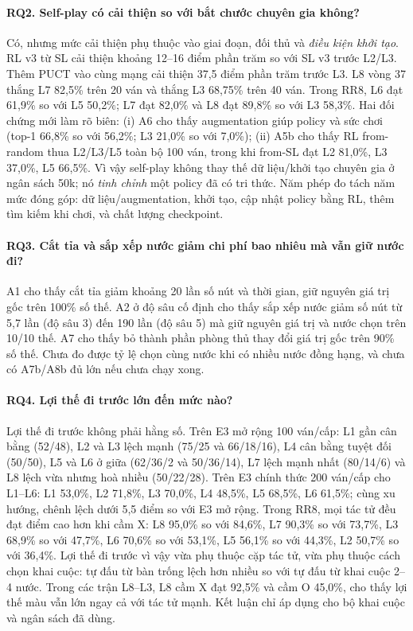 \paragraph{RQ2. Self-play có cải thiện so với bắt chước chuyên gia không?}
Có, nhưng mức cải thiện phụ thuộc vào giai đoạn, đối thủ và \emph{điều kiện khởi tạo}. RL v3
từ SL cải thiện khoảng 12--16 điểm phần trăm so với SL v3 trước L2/L3. Thêm PUCT vào cùng mạng
cải thiện 37,5 điểm phần trăm trước L3. L8 vòng 37 thắng L7 82,5\% trên 20 ván và thắng L3
68,75\% trên 40 ván. Trong RR8, L6 đạt 61,9\% so với L5 50,2\%; L7 đạt 82,0\% và L8 đạt 89,8\%
so với L3 58,3\%. Hai đối chứng mới làm rõ biên: (i) A6 cho thấy augmentation giúp policy và sức
chơi (top-1 66,8\% so với 56,2\%; L3 21,0\% so với 7,0\%); (ii) A5b cho thấy RL from-random
thua L2/L3/L5 toàn bộ 100 ván, trong khi from-SL đạt L2 81,0\%, L3 37,0\%, L5 66,5\%. Vì vậy
self-play không thay thế dữ liệu/khởi tạo chuyên gia ở ngân sách 50k; nó \emph{tinh chỉnh} một
policy đã có tri thức. Năm phép đo tách năm mức đóng góp: dữ liệu/augmentation, khởi tạo, cập
nhật policy bằng RL, thêm tìm kiếm khi chơi, và chất lượng checkpoint.

\paragraph{RQ3. Cắt tỉa và sắp xếp nước giảm chi phí bao nhiêu mà vẫn giữ nước đi?}
A1 cho thấy cắt tỉa giảm khoảng 20 lần số nút và thời gian, giữ nguyên giá trị gốc trên 100\%
số thế. A2 ở độ sâu cố định cho thấy sắp xếp nước giảm số nút từ 5,7 lần (độ sâu 3) đến 190 lần (độ sâu 5)
mà giữ nguyên giá trị và nước chọn trên 10/10 thế. A7 cho thấy bỏ thành phần
phòng thủ thay đổi giá trị gốc trên 90\% số thế. Chưa đo được tỷ lệ chọn cùng nước khi có nhiều
nước đồng hạng, và chưa có A7b/A8b đủ lớn nếu chưa chạy xong.

\paragraph{RQ4. Lợi thế đi trước lớn đến mức nào?}
Lợi thế đi trước không phải hằng số. Trên E3 mở rộng 100 ván/cấp: L1 gần cân bằng (52/48), L2
và L3 lệch mạnh (75/25 và 66/18/16), L4 cân bằng tuyệt đối (50/50), L5 và L6 ở giữa (62/36/2
và 50/36/14), L7 lệch mạnh nhất (80/14/6) và L8 lệch vừa nhưng hoà nhiều (50/22/28). Trên E3
chính thức 200 ván/cấp cho L1--L6: L1 53,0\%, L2 71,8\%, L3 70,0\%, L4 48,5\%, L5 68,5\%, L6
61,5\%; cùng xu hướng, chênh lệch dưới 5,5 điểm so với E3 mở rộng. Trong RR8, mọi tác tử đều đạt điểm
cao hơn khi cầm X: L8 95,0\% so với 84,6\%, L7 90,3\% so với 73,7\%, L3 68,9\% so với 47,7\%,
L6 70,6\% so với 53,1\%, L5 56,1\% so với 44,3\%, L2 50,7\% so với 36,4\%. Lợi thế đi trước vì
vậy vừa phụ thuộc cặp tác tử, vừa phụ thuộc cách chọn khai cuộc: tự đấu từ bàn trống lệch hơn
nhiều so với tự đấu từ khai cuộc 2--4 nước. Trong các trận L8--L3, L8 cầm X đạt
92,5\% và cầm O 45,0\%, cho thấy lợi thế màu vẫn lớn ngay cả với tác tử mạnh. Kết luận chỉ áp
dụng cho bộ khai cuộc và ngân sách đã dùng.